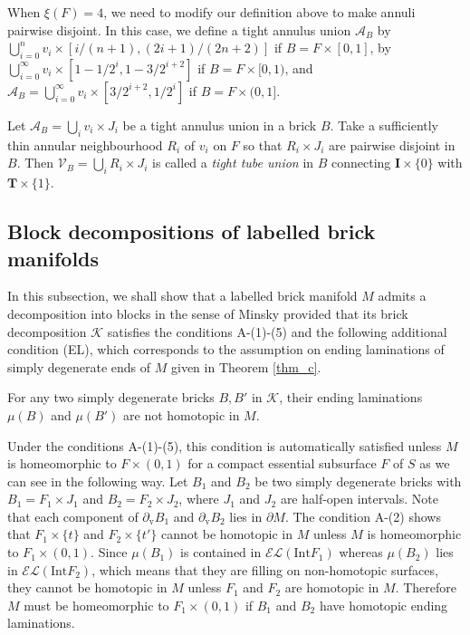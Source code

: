 \documentclass{amsart}
\theoremstyle{definition}
\numberwithin{figure}{section}
\numberwithin{equation}{section}
\newcommand{\EL}{\mathcal{EL}}
\def\v{\mathrm{v}}
\def\ca{\mathcal{A}}
\def\ck{\mathcal{K}}
\def\cv{\mathcal{V}}
\def\Int{\mathrm{Int}}
\begin{document}
When $\xi(F)=4$, we need to modify our definition above to make annuli pairwise disjoint.
In this case, we define a tight annulus union $\ca_B$ by $\bigcup_{i=0}^n v_i\times [i/(n+1),(2i+1)/(2n+2)]$ if $B=F\times [0,1]$, by $\bigcup_{i=0}^\infty v_i\times [1-1/2^i,1-3/2^{i+2}]$ if $B=F\times [0,1)$, and $\ca_B=\bigcup_{i=0}^\infty v_i\times [ 3/2^{i+2},1/2^i]$ if $B=F\times (0,1]$.


Let $\ca_B=\bigcup_i v_i\times J_i$ be a tight annulus union in a brick $B$.
Take a sufficiently thin annular neighbourhood $R_i$ of $v_i$ on $F$ so that $R_i\times J_i$ are pairwise 
disjoint in $B$.
Then $\cv_B=\bigcup_i R_i\times J_i$ is called a \emph{tight tube union} in $B$ connecting $\boldsymbol{I}\times \{0\}$ with $\boldsymbol{T}\times \{1\}$.


\subsection{Block decompositions of labelled brick manifolds}\label{SS_block}

In this subsection, we shall show that a labelled brick manifold $M$ admits a decomposition into blocks in the sense of Minsky provided that its 
brick decomposition $\ck$ satisfies the conditions A-(1)-(5) and the following additional condition (EL), 
which corresponds to the 
assumption on ending laminations of  simply degenerate ends of $M$ given in Theorem \ref{thm_c}.

\bigskip

For any two simply degenerate bricks $B,B'$ in $\ck$, their ending laminations $\mu(B)$ and $\mu(B')$ are 
not homotopic in $M$.

\bigskip

 Under the conditions A-(1)-(5), this condition is automatically satisfied unless $M$ is  homeomorphic to $F\times (0,1)$ 
for a compact essential subsurface $F$ of $S$ as we can see in the following way.
Let $B_1$ and $B_2$ be two simply degenerate bricks with $B_1 =F_1 \times J_1$ and $B_2=F_2 \times J_2$, where $J_1$ and $J_2$ are half-open intervals.
Note that each  component of $\partial_\v B_1$ and $\partial_\v B_2$ lies in $\partial M$.
The condition A-(2) shows that $F_1 \times \{t\}$ and $F_2 \times \{t'\}$ cannot be homotopic in $M$ unless $M$ is homeomorphic to $F_1 \times (0,1)$.
Since $\mu(B_1)$ is contained in $\EL(\Int F_1)$ whereas $\mu(B_2)$ lies in $\EL(\Int F_2)$, which means that they are filling on non-homotopic surfaces, they cannot be homotopic in $M$ unless $F_1$ and $F_2$ are homotopic in $M$.
Therefore $M$ must be homeomorphic to $F_1 \times (0,1)$ if $B_1$ and $B_2$ have homotopic ending laminations.
\end{document}

